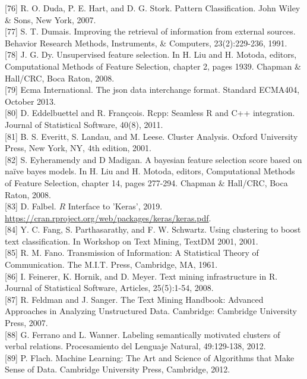 \documentclass[10pt]{book}
\begin{document}
[76] R. O. Duda, P. E. Hart, and D. G. Stork. Pattern Classification. John Wiley \& Sons, New York, 2007.\\[0pt]
[77] S. T. Dumais. Improving the retrieval of information from external sources. Behavior Research Methods, Instruments, \& Computers, 23(2):229-236, 1991.\\[0pt]
[78] J. G. Dy. Unsupervised feature selection. In H. Liu and H. Motoda, editors, Computational Methods of Feature Selection, chapter 2, pages 1939. Chapman \& Hall/CRC, Boca Raton, 2008.\\[0pt]
[79] Ecma International. The json data interchange format. Standard ECMA404, October 2013.\\[0pt]
[80] D. Eddelbuettel and R. Françcois. Rcpp: Seamless R and C++ integration. Journal of Statistical Software, 40(8), 2011.\\[0pt]
[81] B. S. Everitt, S. Landau, and M. Leese. Cluster Analysis. Oxford University Press, New York, NY, 4th edition, 2001.\\[0pt]
[82] S. Eyheramendy and D Madigan. A bayesian feature selection score based on naïve bayes models. In H. Liu and H. Motoda, editors, Computational Methods of Feature Selection, chapter 14, pages 277-294. Chapman \& Hall/CRC, Boca Raton, 2008.\\[0pt]
[83] D. Falbel. $R$ Interface to 'Keras', 2019. \href{https://cran.rproject.org/web/packages/keras/keras.pdf}{https://cran.rproject.org/web/packages/keras/keras.pdf}.\\[0pt]
[84] Y. C. Fang, S. Parthasarathy, and F. W. Schwartz. Using clustering to boost text classification. In Workshop on Text Mining, TextDM 2001, 2001.\\[0pt]
[85] R. M. Fano. Transmission of Information: A Statistical Theory of Communication. The M.I.T. Press, Cambridge, MA, 1961.\\[0pt]
[86] I. Feinerer, K. Hornik, and D. Meyer. Text mining infrastructure in R. Journal of Statistical Software, Articles, 25(5):1-54, 2008.\\[0pt]
[87] R. Feldman and J. Sanger. The Text Mining Handbook: Advanced Approaches in Analyzing Unstructured Data. Cambridge: Cambridge University Press, 2007.\\[0pt]
[88] G. Ferrano and L. Wanner. Labeling semantically motivated clusters of verbal relations. Procesamiento del Lenguaje Natural, 49:129-138, 2012.\\[0pt]
[89] P. Flach. Machine Learning: The Art and Science of Algorithms that Make Sense of Data. Cambridge University Press, Cambridge, 2012.\\[0pt]
\end{document}
